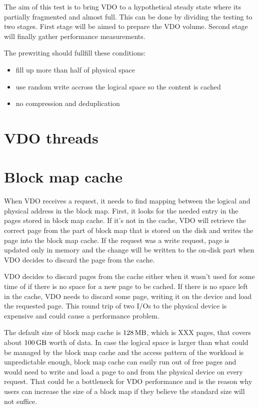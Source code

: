 \documentclass[
  color, %
  table, %
  lof,   %
  lot,   %
]{fithesis3}
\begin{document}
The aim of this test is to bring VDO to a hypothetical steady state where its partially fragmented and almost full. This can be done by dividing the testing to two stages. First stage will be aimed to prepare the VDO volume. Second stage will finally gather performance measurements.

The prewriting should fullfill these conditions:
\begin{itemize}
    \item fill up more than half of physical space
    \item use random write accross the logical space so the content is cached
    \item no compression and deduplication
\end{itemize}





\section{VDO threads}

\section{Block map cache}

When VDO receives a request, it needs to find mapping between the logical and physical address in the block map. First, it looks for the needed entry in the pages stored in block map cache. If it's not in the cache, VDO will retrieve the correct page from the part of block map that is stored on the disk and writes the page into the block map cache. If the request was a write request, page is updated only in memory and the change will be written to the on-disk part when VDO decides to discard the page from the cache.

VDO decides to discard pages from the cache either when it wasn't used for some time of if there is no space for a new page to be cached. If there is no space left in the cache, VDO needs to discard some page, writing it on the device and load the requested page. This round trip of two I/Os to the physical device is expensive and could cause a performance problem.

The default size of block map cache is $\SI{128}{\mega\byte}$, which is XXX pages, that covers about $\SI{100}{\giga\byte}$ worth of data. In case the logical space is larger than what could be managed by the block map cache and the access pattern of the workload is unpredictable enough, block map cache can easily run out of free pages and would need to write and load a page to and from the physical device on every request. That could be a bottleneck for VDO performance and is the reason why users can increase the size of a block map if they believe the standard size will not suffice.
\end{document}

